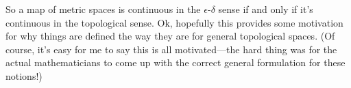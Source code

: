 So a map of metric spaces is continuous in the $\epsilon$-$\delta$
sense if and only if it's continuous in the topological sense. Ok,
hopefully this provides some motivation for why things are defined the
way they are for general topological spaces. (Of course, it's easy for
me to say this is all motivated---the hard thing was for the actual
mathematicians to come up with the correct general formulation for
these notions!)




